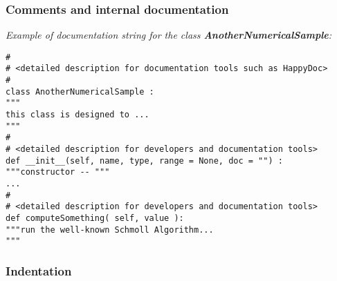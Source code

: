 \subsubsection{Comments and internal documentation}
\emph{Example of documentation string for the class {\bf AnotherNumericalSample}:}
\lstset{language=Python, basicstyle=\normalsize}
\begin{lstlisting}[frame=TBRL]
#
# <detailed description for documentation tools such as HappyDoc>
#
class AnotherNumericalSample :
"""
this class is designed to ...
"""
#
# <detailed description for developers and documentation tools>
def __init__(self, name, type, range = None, doc = "") :
"""constructor -- """
...
#
# <detailed description for developers and documentation tools>
def computeSomething( self, value ):
"""run the well-known Schmoll Algorithm...
"""
\end{lstlisting}


\subsubsection{Indentation}

